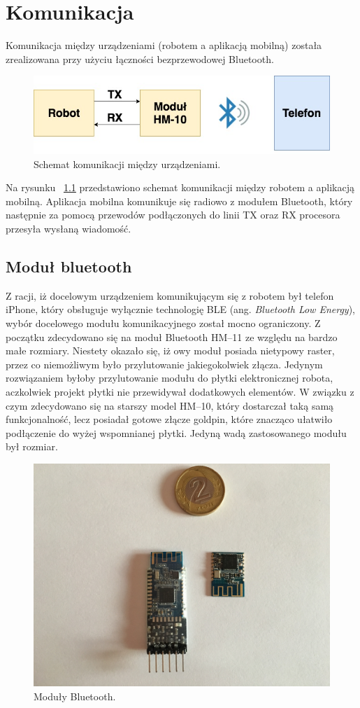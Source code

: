 \chapter{Komunikacja}
Komunikacja między urządzeniami (robotem a aplikacją mobilną) została zrealizowana przy użyciu łączności bezprzewodowej Bluetooth. 

\begin{figure}[H]
	\centering
		\includegraphics[width=0.75\linewidth]{pic03/bt_communications.jpg}
	\caption{Schemat komunikacji między urządzeniami.}
	\label{fig:communication}	
\end{figure}

Na rysunku ~\ref{fig:communication} przedstawiono schemat komunikacji między robotem a aplikacją mobilną. Aplikacja mobilna komunikuje się radiowo z modułem Bluetooth, który następnie za pomocą przewodów podłączonych do linii TX oraz RX procesora przesyła wysłaną wiadomość.   

\section{Moduł bluetooth}
Z racji, iż docelowym urządzeniem komunikującym się z robotem był telefon iPhone, który obsługuje wyłącznie technologię BLE (ang. \textit{Bluetooth Low Energy}), wybór docelowego modułu komunikacyjnego został mocno ograniczony. Z początku zdecydowano się na moduł Bluetooth HM–11 ze względu na bardzo małe rozmiary. Niestety okazało się, iż owy moduł posiada nietypowy raster, przez co niemożliwym było przylutowanie jakiegokolwiek złącza. Jedynym rozwiązaniem byłoby przylutowanie modułu do płytki elektronicznej robota, aczkolwiek projekt płytki nie przewidywał dodatkowych elementów. W związku z czym zdecydowano się na starszy model HM–10, który dostarczał taką samą funkcjonalność, lecz posiadał gotowe złącze goldpin, które znacząco ułatwiło podłączenie do wyżej wspomnianej płytki. Jedyną wadą zastosowanego modułu był rozmiar.

\begin{figure}[H]
	\centering
		\includegraphics[width=0.75\linewidth]{pic03/bt_modules.jpg}
	\caption{Moduły Bluetooth.}
	\label{fig:bt}	
\end{figure}

